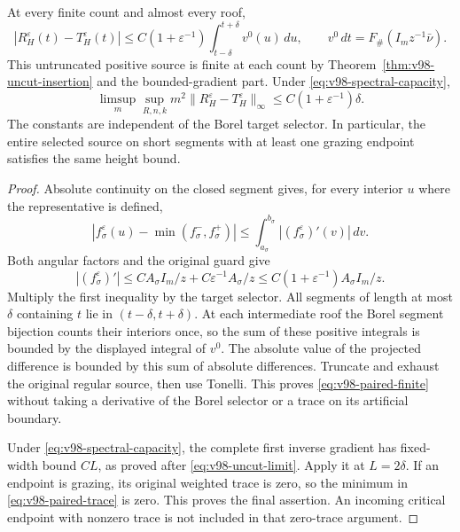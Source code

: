 \begin{theorem}
\label{thm:v98-paired-trace}
At every finite count and almost every roof,
\begin{equation}\label{eq:v98-paired-finite}
 |R_H^\varepsilon(t)-T_H^\varepsilon(t)|
 \le C(1+\varepsilon^{-1})\int_{t-\delta}^{t+\delta}v^0(u)\,du,
 \qquad v^0\,dt=F_\#(I_mz^{-1}\bar\nu).
\end{equation}
This untruncated positive source is finite at each count by
Theorem~\ref{thm:v98-uncut-insertion} and the bounded-gradient part.
Under \eqref{eq:v98-spectral-capacity},
\begin{equation}\label{eq:v98-paired-height}
 \limsup_m\sup_{R,n,k}m^2
       \|R_H^\varepsilon-T_H^\varepsilon\|_\infty
                         \le C(1+\varepsilon^{-1})\delta.
\end{equation}
The constants are independent of the Borel target selector. In
particular, the entire selected source on short segments with at
least one grazing endpoint satisfies the same height bound.
\end{theorem}
\begin{proof}
Absolute continuity on the closed segment gives, for every interior
$u$ where the representative is defined,
\[
 |f_\sigma^\varepsilon(u)-\min(f_\sigma^-,f_\sigma^+)|
       \le\int_{a_\sigma}^{b_\sigma}|(f_\sigma^\varepsilon)'(v)|\,dv.
\]
Both angular factors and the original guard give
\[
 |(f_\sigma^\varepsilon)'|
 \le C A_\sigma I_m/z+C\varepsilon^{-1}A_\sigma/z
 \le C(1+\varepsilon^{-1})A_\sigma I_m/z.
\]
Multiply the first inequality by the target selector. All segments
of length at most $\delta$ containing $t$ lie in
$(t-\delta,t+\delta)$. At each intermediate roof the Borel segment
bijection counts their interiors once, so the sum of these positive
integrals is bounded by the displayed integral of $v^0$.
The absolute value of the projected difference is bounded by this
sum of absolute differences. Truncate and exhaust the original
regular source, then use Tonelli. This proves
\eqref{eq:v98-paired-finite} without taking a derivative of the
Borel selector or a trace on its artificial boundary.

Under \eqref{eq:v98-spectral-capacity}, the complete first inverse
gradient has fixed-width bound $CL$, as proved after
\eqref{eq:v98-uncut-limit}. Apply it at $L=2\delta$.
If an endpoint is grazing, its original weighted trace is zero,
so the minimum in \eqref{eq:v98-paired-trace} is zero. This proves
the final assertion. An incoming critical endpoint with nonzero
trace is not included in that zero-trace argument.
\end{proof}

